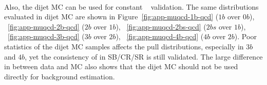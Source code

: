 \paragraph{}
Also, the dijet MC can be used for constant \muqcd~ validation. 
The same distributions evaluated in dijet MC are shown in Figure~\ref{fig:app-muqcd-1b-qcd} ($1b$ over $0b$), ~\ref{fig:app-muqcd-2b-qcd} ($2b$ over $1b$), ~\ref{fig:app-muqcd-2bs-qcd} ($2bs$ over $1b$), ~\ref{fig:app-muqcd-3b-qcd} ($3b$ over $2b$), ~\ref{fig:app-muqcd-4b-qcd} ($4b$ over $2b$).  
Poor statistics of the dijet MC samples affects the pull distributions, especially in $3b$ and $4b$, yet the consistency of \muqcd in SB/CR/SR is still validated.
The large difference in \muqcd between data and MC also shows that the dijet MC should not be used directly for background estimation.

